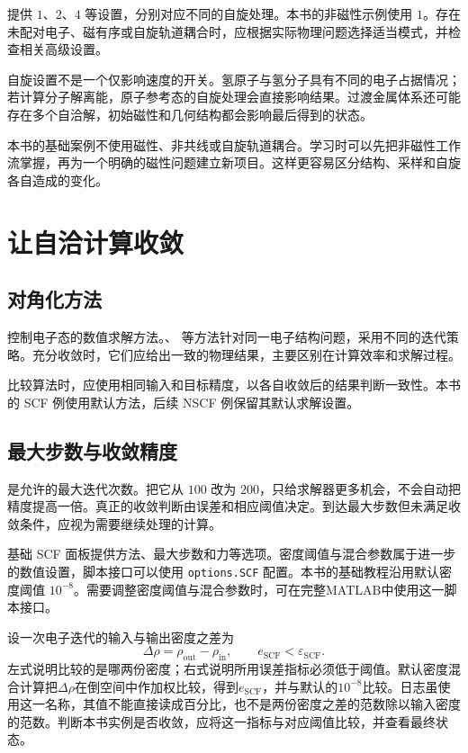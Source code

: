  提供 $1$、$2$、$4$ 等设置，分别对应不同的自旋处理。本书的非磁性示例使用 $1$。存在未配对电子、磁有序或自旋轨道耦合时，应根据实际物理问题选择适当模式，并检查相关高级设置。

自旋设置不是一个仅影响速度的开关。氢原子与氢分子具有不同的电子占据情况；若计算分子解离能，原子参考态的自旋处理会直接影响结果。过渡金属体系还可能存在多个自洽解，初始磁性和几何结构都会影响最后得到的状态。

本书的基础案例不使用磁性、非共线或自旋轨道耦合。学习时可以先把非磁性工作流掌握，再为一个明确的磁性问题建立新项目。这样更容易区分结构、采样和自旋各自造成的变化。

\section{让自洽计算收敛}

\subsection{对角化方法}

 控制电子态的数值求解方法。、 等方法针对同一电子结构问题，采用不同的迭代策略。充分收敛时，它们应给出一致的物理结果，主要区别在计算效率和求解过程。

比较算法时，应使用相同输入和目标精度，以各自收敛后的结果判断一致性。本书的 SCF 例使用默认方法，后续 NSCF 例保留其默认求解设置。

\subsection{最大步数与收敛精度}

 是允许的最大迭代次数。把它从 $100$ 改为 $200$，只给求解器更多机会，不会自动把精度提高一倍。真正的收敛判断由误差和相应阈值决定。到达最大步数但未满足收敛条件，应视为需要继续处理的计算。

基础 SCF 面板提供方法、最大步数和力等选项。密度阈值与混合参数属于进一步的数值设置，脚本接口可以使用 \texttt{options.SCF} 配置。本书的基础教程沿用默认密度阈值 $10^{-8}$。需要调整密度阈值与混合参数时，可在完整MATLAB\regmark{}中使用这一脚本接口。


设一次电子迭代的输入与输出密度之差为
\begin{equation}
  \Delta\rho=\rho_{\mathrm{out}}-\rho_{\mathrm{in}},
  \qquad e_{\mathrm{SCF}}<\varepsilon_{\mathrm{SCF}}.
  \label{eq:scf-stopping}
\end{equation}
左式说明比较的是哪两份密度；右式说明所用误差指标必须低于阈值。默认密度混合计算把$\Delta\rho$在倒空间中作加权比较，得到$e_{\mathrm{SCF}}$，并与默认的$10^{-8}$比较。日志虽使用这一名称，其值不能直接读成百分比，也不是两份密度之差的范数除以输入密度的范数。判断本书实例是否收敛，应将这一指标与对应阈值比较，并查看最终状态。


